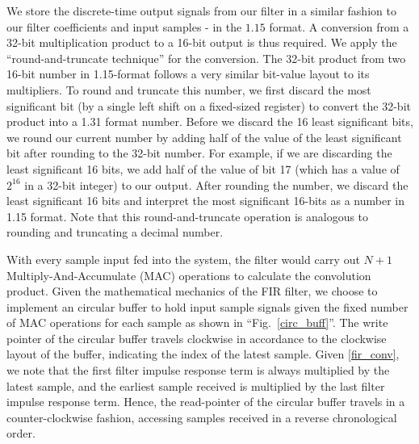 \documentclass[conference]{IEEEtran}
\begin{document}
We store the discrete-time output signals from our filter in a similar fashion to our filter coefficients and input samples - in the $1.15$ format. A conversion from a 32-bit multiplication product to a 16-bit output is thus required. We apply the ``round-and-truncate technique'' for the conversion. The 32-bit product from two 16-bit number in 1.15-format follows a very similar bit-value layout to its multipliers. To round and truncate this number, we first discard the most significant bit (by a single left shift on a fixed-sized register) to convert the 32-bit product into a 1.31 format number. Before we discard the 16 least significant bits, we round our current number by adding half of the value of the least significant bit after rounding to the 32-bit number. For example, if we are discarding the least significant 16 bits, we add half of the value of bit 17 (which has a value of $2^16$ in a 32-bit integer) to our output. After rounding the number, we discard the least significant 16 bits and interpret the most significant 16-bits as a number in 1.15 format. Note that this round-and-truncate operation is analogous to rounding and truncating a decimal number. 

With every sample input fed into the system, the filter would carry out $N+1$ Multiply-And-Accumulate (MAC) operations to calculate the convolution product. Given the mathematical mechanics of the FIR filter, we choose to implement an circular buffer to hold input sample signals given the fixed number of MAC operations for each sample as shown in ``Fig.~\ref{circ_buff}''. The write pointer of the circular buffer travels clockwise in accordance to the clockwise layout of the buffer, indicating the index of the latest sample. Given \eqref{fir_conv}, we note that the first filter impulse response term is always multiplied by the latest sample, and the earliest sample received is multiplied by the last filter impulse response term. Hence, the read-pointer of the circular buffer travels in a counter-clockwise fashion, accessing samples received in a reverse chronological order. 
\end{document}
